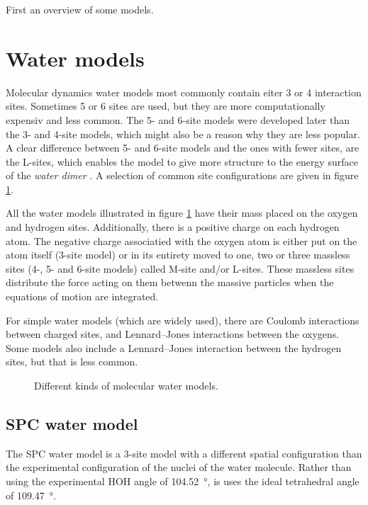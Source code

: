 First an overview of some models.

\section{Water models}

Molecular dynamics water models most commonly contain eiter 3 or 4 interaction sites. Sometimes 5 or 6 sites are used, but they are more computationally expensiv and less common. The 5- and 6-site models were developed later than the 3- and 4-site models, which might also be a reason why they are less popular. A clear difference between 5- and 6-site models and the ones with fewer sites, are the L-sites, which enables the model to give more structure to the energy surface of the \emph{water dimer} \cite{Mahoney2000}. A selection of common site configurations are given in figure \ref{fig:water_models}. 

All the water models illustrated in figure \ref{fig:water_models} have their mass placed on the oxygen and hydrogen sites. Additionally, there is a positive charge on each hydrogen atom. The negative charge associatied with the oxygen atom is either put on the atom itself (3-site model) or in its entirety moved to one, two or three massless sites (4-, 5- and 6-site models) called M-site and/or L-sites. These massless sites distribute the force acting on them betwenn the massive particles when the equations of motion are integrated.

For simple water models (which are widely used), there are Coulomb interactions between charged sites, and Lennard--Jones interactions between the oxygens. Some models also include a Lennard--Jones interaction between the hydrogen sites, but that is less common.


\begin{figure}
\centering
{}
\qquad
{}\qquad
{}\qquad
{}
\chemnameinit{}
\caption{Different kinds of molecular water models.}
\label{fig:water_models}
\end{figure}

\subsection{SPC water model}
The SPC water model is a 3-site model with a different spatial configuration than the experimental configuration of the nuclei of the water molecule. Rather than using the experimental HOH angle of \SI{104.52}{\degree}, is uses the ideal tetrahedral angle of \SI{109.47}{\degree}. 

